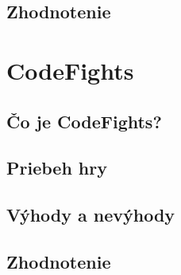 \documentclass[slovak,a4paper,11pt]{article}
\begin{document}
\subsection{Zhodnotenie}
\section{CodeFights}
\subsection{Čo je CodeFights?}
\subsection{Priebeh hry}
\subsection{Výhody a nevýhody}
\subsection{Zhodnotenie}
\section{}

%
%
\end{document}
